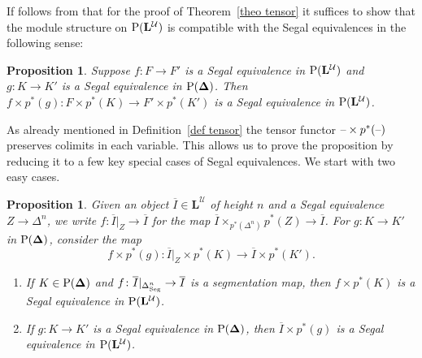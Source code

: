\documentclass{amsart}
\numberwithin{theorem}{subsection}
\newtheorem{proposition}[theorem]{Proposition}
\newtheorem{propn}[theorem]{Proposition}
\theoremstyle{definition}
\newcommand{\xU}{\mathcal{U}}
\newcommand{\olI}{\overline{I}}
\newcommand{\Pre}{\name{P}}
\newcommand{\name}[1]{\ensuremath{\text{\textup{#1}}}}
\newcommand{\simp}{\mathbf{\Delta}}
\newcommand{\levelg}{\mathbf{L}}
\newcommand{\levelU}{\levelg^\xU}
\newcommand{\Seg}{\name{Seg}}
\newcommand{\blank}{\text{\textendash}}
\begin{document}
If follows from \cite[Proposition 2.2.1.9]{ha} that for the proof of Theorem~\ref{theo tensor} it suffices to show that the module structure on $\Pre(\levelU)$ is compatible with the Segal equivalences in the following sense:
\begin{proposition}\label{propn Seg tensor}
	Suppose $f \colon F \to F'$ is a Segal equivalence in $\Pre(\levelU)$ and $g \colon K \to K'$ is a Segal equivalence in $\Pre(\simp)$.
	Then $f \times p^*(g) \colon F \times p^*(K) \to F' \times p^{*}(K')$ is a Segal equivalence in $\Pre(\levelU)$.
\end{proposition}
As already mentioned in Definition~\ref{def tensor} the tensor functor $\blank \times p^*(\blank)$ preserves colimits in each variable.
This allows us to prove the proposition by reducing it to a few key special cases of Segal equivalences. We start with two easy cases.
\begin{propn}\label{propn prelim Seg tensor}
Given an object $\olI \in \levelU$ of height $n$ and a Segal equivalence $Z \to \Delta^{n}$, we write $f\colon \olI|_Z \to \olI$ for the map $\olI \times_{p^*(\Delta^n)}p^*(Z)\to \olI$.
For $g \colon K \to K'$ in $\Pre(\simp)$, consider the map
		\[f \times p^*(g) \colon  \olI|_{Z} \times
		p^*(K) \to \olI \times p^*(K').\] 
\begin{enumerate}
\item If $K\in \Pre(\simp)$ and $f \colon \olI|_{\Delta^n_\Seg} \to \olI$ is a segmentation map, then $f \times p^*(K)$ is a Segal equivalence in $\Pre(\levelU)$.\label{prelim Seg tensor one}
\item If $g \colon K\to K'$ is a Segal equivalence in $\Pre(\simp)$, then $\olI \times p^*(g)$ is a Segal equivalence in $\Pre(\levelU)$. \label{prelim Seg tensor two}
\end{enumerate}
\end{propn}
\end{document}

